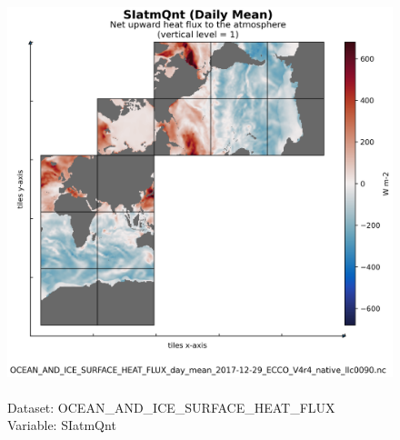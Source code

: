 \begin{figure}[H]
\centering
\includegraphics[scale=0.5]{../images/plots/native_plots/Ocean_and_Sea-Ice_Surface_Heat_Fluxes/SIatmQnt.png}
\caption{\\Dataset: OCEAN\_AND\_ICE\_SURFACE\_HEAT\_FLUX\\Variable: SIatmQnt}
\label{tab:table-OCEAN_AND_ICE_SURFACE_HEAT_FLUX_SIatmQnt-Plot}
\end{figure}
\pagebreak
